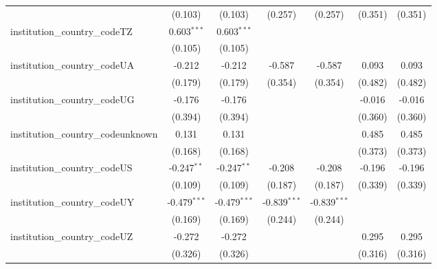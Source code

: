 \begin{tabular}{lcccccc}
                                         & (0.103)        & (0.103)        & (0.257)        & (0.257)        & (0.351)        & (0.351)\\   
   institution\_country\_codeTZ          & 0.603$^{***}$  & 0.603$^{***}$  &                &                &                &   \\   
                                         & (0.105)        & (0.105)        &                &                &                &   \\   
   institution\_country\_codeUA          & -0.212         & -0.212         & -0.587         & -0.587         & 0.093          & 0.093\\   
                                         & (0.179)        & (0.179)        & (0.354)        & (0.354)        & (0.482)        & (0.482)\\   
   institution\_country\_codeUG          & -0.176         & -0.176         &                &                & -0.016         & -0.016\\   
                                         & (0.394)        & (0.394)        &                &                & (0.360)        & (0.360)\\   
   institution\_country\_codeunknown     & 0.131          & 0.131          &                &                & 0.485          & 0.485\\   
                                         & (0.168)        & (0.168)        &                &                & (0.373)        & (0.373)\\   
   institution\_country\_codeUS          & -0.247$^{**}$  & -0.247$^{**}$  & -0.208         & -0.208         & -0.196         & -0.196\\   
                                         & (0.109)        & (0.109)        & (0.187)        & (0.187)        & (0.339)        & (0.339)\\   
   institution\_country\_codeUY          & -0.479$^{***}$ & -0.479$^{***}$ & -0.839$^{***}$ & -0.839$^{***}$ &                &   \\   
                                         & (0.169)        & (0.169)        & (0.244)        & (0.244)        &                &   \\   
   institution\_country\_codeUZ          & -0.272         & -0.272         &                &                & 0.295          & 0.295\\   
                                         & (0.326)        & (0.326)        &                &                & (0.316)        & (0.316)\\   

\end{tabular}
